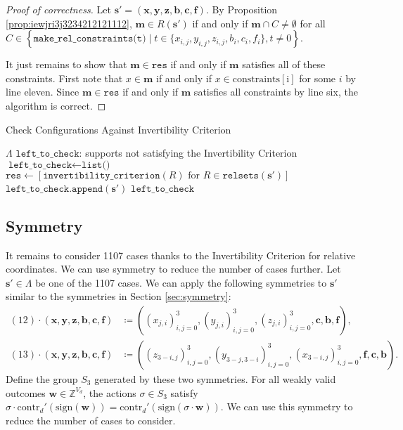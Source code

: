 \begin{proof}[Proof of correctness]
    Let \( \mathbf{s}' = (\mathbf{x}, \mathbf{y}, \mathbf{z}, \mathbf{b}, \mathbf{c}, \mathbf{f}) \).
    By Proposition \ref{prop:iewjri3j3234212121112}, \( \mathbf{m} \in R(\mathbf{s}') \) if and only if \( \mathbf{m} \cap C \neq \emptyset \) for all \( C \in \left\{ \texttt{make\_rel\_constraints(t)} \mid t \in \{x_{i,j}, y_{i,j}, z_{i,j}, b_i, c_i, f_i\}, t \neq 0 \right\} \).

    It just remains to show that \( \mathbf{m} \in \texttt{res} \) if and only if \( \mathbf{m} \) satisfies all of these constraints. First note that \( x \in \mathbf{m} \) if and only if \( x \in \mathrm{constraints[i]} \) for some \( i \) by line eleven. Since \( \mathbf{m} \in \texttt{res}  \) if and only if \( \mathbf{m} \) satisfies all constraints by line six, the algorithm is correct.
\end{proof}

\begin{algorithm}
\caption{Check Configurations Against Invertibility Criterion}
\label{alg:jwenkjdn2kj32}
\begin{algorithmic}[1]
\Require $\Lambda$
\Ensure $\texttt{left\_to\_check}$: supports not satisfying the Invertibility Criterion
\State $\texttt{left\_to\_check} \gets \texttt{list()}$ 
    \State $\texttt{res} \gets [\texttt{invertibility\_criterion}(R) \text{ for } R \in \texttt{relsets}(\mathbf{s}')]$
        \State $\texttt{left\_to\_check.append}(\mathbf{s}')$
    \EndIf
\EndFor
\State \Return $\texttt{left\_to\_check}$
\end{algorithmic}
\end{algorithm}

\subsection{Symmetry}

It remains to consider 1107 cases thanks to the Invertibility Criterion for relative coordinates. We can use symmetry to reduce the number of cases further. Let \( \mathbf{s}' \in \Lambda \) be one of the 1107 cases. We can apply the following symmetries to \( \mathbf{s}' \) similar to the symmetries in Section \ref{sec:symmetry}:
\begin{align*}
    (12) \cdot (\mathbf{x}, \mathbf{y}, \mathbf{z}, \mathbf{b}, \mathbf{c}, \mathbf{f}) &\coloneqq ((x_{j,i})_{i,j=0}^3, (y_{j,i})_{i,j=0}^3, (z_{j,i})_{i,j=0}^3, \mathbf{c}, \mathbf{b}, \mathbf{f}), \\
    (13) \cdot (\mathbf{x}, \mathbf{y}, \mathbf{z}, \mathbf{b}, \mathbf{c}, \mathbf{f}) &\coloneqq ((z_{3-i,j})_{i,j=0}^3, (y_{3-j,3-i})_{i,j=0}^3, (x_{3-i,j})_{i,j=0}^3, \mathbf{f}, \mathbf{c}, \mathbf{b}).
\end{align*}
Define the group \( S_3 \) generated by these two symmetries. For all weakly valid outcomes \( \mathbf{w} \in \mathbb{Z}^{V_d} \), the actions \( \sigma \in S_3 \) satisfy \( \sigma \cdot \mathrm{contr}_d'(\mathrm{sign}(\mathbf{w})) = \mathrm{contr}_d'(\mathrm{sign}(\sigma \cdot \mathbf{w})) \).
We can use this symmetry to reduce the number of cases to consider.

